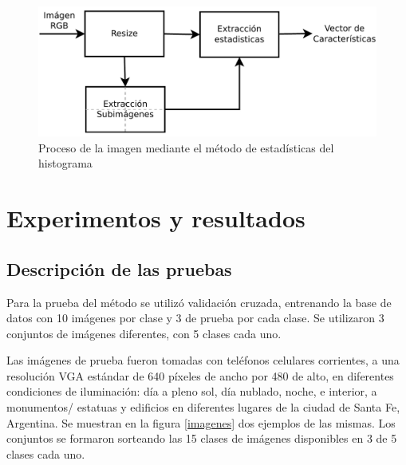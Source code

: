 \documentclass[conference,spanish,a4paper,10pt,oneside,final]{tfmpd}
\begin{document}
\begin{figure}
\begin{center}
\includegraphics[scale=0.25]{../diagramas/procesoestadisticas} 
\end{center}
\caption{Proceso de la imagen mediante el método de estadísticas del histograma}
\label{procesoestadisticas}
\end{figure}
%
%
%
%
\section{Experimentos y resultados}
%
%
\subsection{Descripción de las pruebas}
Para la prueba del método se utilizó validación cruzada, entrenando la base de
datos con 10 imágenes por clase y 3 de prueba por cada clase. Se utilizaron
3 conjuntos de imágenes diferentes, con 5 clases cada uno.

Las imágenes de prueba fueron tomadas con teléfonos celulares corrientes, a una
resolución VGA estándar de 640 píxeles de ancho por 480 de alto, en
diferentes condiciones
de iluminación: día a pleno sol, día nublado, noche, e interior, a monumentos/%
estatuas y edificios en diferentes lugares de la ciudad de Santa Fe, Argentina.
Se muestran en la figura \ref{imagenes} dos ejemplos de las mismas.
Los conjuntos se formaron sorteando las 15 clases de imágenes disponibles en
3 de 5 clases cada uno.
\end{document}

